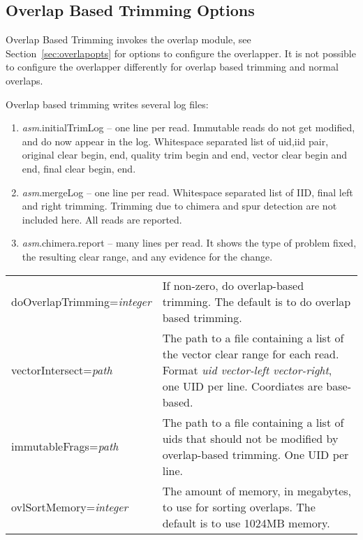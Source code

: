 \documentclass[twoside,11pt]{article}
\begin{document}
\subsection{Overlap Based Trimming Options}
\label{sec:obtopts}

Overlap Based Trimming invokes the overlap module, see
Section~\ref{sec:overlapopts} for options to configure the overlapper.
It is not possible to configure the overlapper differently for overlap
based trimming and normal overlaps.

Overlap based trimming writes several log files:

\begin{enumerate}
\item {\it asm}.initialTrimLog -- one line per read.  Immutable reads do not
get modified, and do now appear in the log.  Whitespace separated list
of uid,iid pair, original clear begin, end, quality trim begin and
end, vector clear begin and end, final clear begin, end.

\item {\it asm}.mergeLog -- one line per read.  Whitespace separated list of
IID, final left and right trimming.  Trimming due to chimera and spur
detection are not included here.  All reads are reported.

\item {\it asm}.chimera.report -- many lines per read.  It shows the type of
problem fixed, the resulting clear range, and any evidence for the
change.
\end{enumerate}


\begin{longtable}{lp{3.0in}}
doOverlapTrimming={\it integer} &
If non-zero, do overlap-based trimming.  The default is to do overlap
based trimming.
\\

vectorIntersect={\it path} &
The path to a file containing a list of the vector clear range for
each read.  Format {\it uid vector-left vector-right}, one UID per
line.  Coordiates are base-based.
\\

immutableFrags={\it path} &
The path to a file containing a list of uids that should not be
modified by overlap-based trimming.  One UID per line.
\\

ovlSortMemory={\it integer} &
The amount of memory, in megabytes, to use for sorting overlaps.  The
default is to use 1024MB memory.
\\
\end{longtable}
\end{document}

